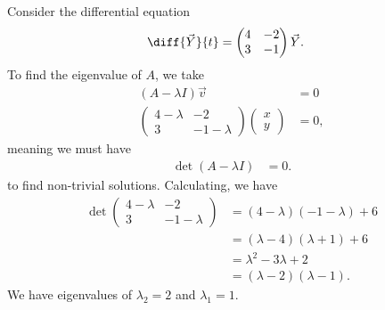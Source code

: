 \documentclass[10pt]{mypackage}
\begin{document}
\begin{example}
  Consider the differential equation
  \begin{align*}
    \diff{\vec{Y}}{t} &= \begin{pmatrix}4 & -2 \\ 3 & -1\end{pmatrix} \vec{Y}.
  \end{align*}
  To find the eigenvalue of $A$, we take
  \begin{align*}
    \left(A - \lambda I\right)\vec{v} &= 0\\
    \begin{pmatrix}4-\lambda & -2 \\ 3 & -1 - \lambda\end{pmatrix} \begin{pmatrix}x\\y\end{pmatrix} &= 0,
  \end{align*}
  meaning we must have
  \begin{align*}
    \det\left(A - \lambda I\right) &= 0.
  \end{align*}
  to find non-trivial solutions. Calculating, we have
  \begin{align*}
    \det \begin{pmatrix}4-\lambda & -2 \\ 3 & -1-\lambda\end{pmatrix} &= \left(4-\lambda\right)\left(-1-\lambda\right) + 6\\
                                  &= \left(\lambda - 4\right)\left(\lambda + 1\right) + 6\\
                                  &= \lambda^2 - 3\lambda + 2\\
                                  &= \left(\lambda - 2\right)\left(\lambda - 1\right).
  \end{align*}
  We have eigenvalues of $\lambda_2 = 2$ and $\lambda_1 = 1$.\newline


\end{example}
\end{document}
